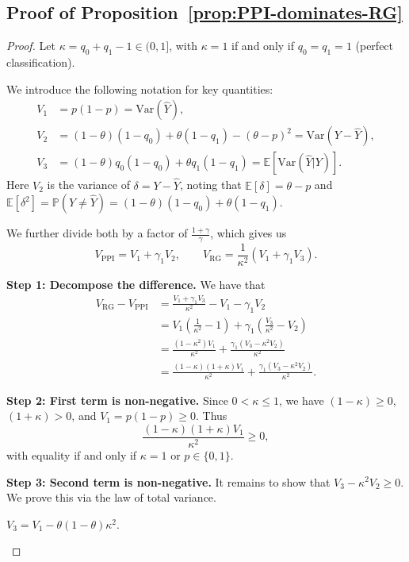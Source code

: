 \subsection{Proof of Proposition~\ref{prop:PPI-dominates-RG}}


\begin{proof}
Let $\kappa = q_0 + q_1 - 1 \in (0,1]$, with $\kappa = 1$ if and only if $q_0 = q_1 = 1$ (perfect classification).

We introduce the following notation for key quantities:
\begin{align*}
V_1 &= p(1-p) = \mathrm{Var}(\hat{Y}), \\
V_2 &= (1-\theta)(1-q_0) + \theta(1-q_1) - (\theta - p)^2 = \mathrm{Var}(Y - \hat{Y}), \\
V_3 &= (1-\theta)q_0(1-q_0) + \theta q_1(1-q_1) = \mathbb{E}[\mathrm{Var}(\hat{Y}|Y)].
\end{align*}
Here $V_2$ is the variance of $\delta = Y - \hat{Y}$, noting that $\mathbb{E}[\delta] = \theta - p$ and $\mathbb{E}[\delta^2] = \mathbb{P}(Y \neq \hat{Y}) = (1-\theta)(1-q_0) + \theta(1-q_1)$.

We further divide both by a factor of $\frac{1+\gamma}{\gamma}$, which gives us
\[
V_{\mathrm{PPI}} = V_1 + \gamma_1 V_2, \qquad
V_{\mathrm{RG}} = \frac{1}{\kappa^2}(V_1 + \gamma_1 V_3).
\]

\textbf{Step 1: Decompose the difference.} We have that
\begin{align*}
V_{\mathrm{RG}} - V_{\mathrm{PPI}} 
&= \frac{V_1 + \gamma_1 V_3}{\kappa^2} - V_1 - \gamma_1 V_2 \\
&= V_1 \left(\frac{1}{\kappa^2} - 1\right) + \gamma_1\left(\frac{V_3}{\kappa^2} - V_2\right) \\
&= \frac{(1-\kappa^2)V_1}{\kappa^2} + \frac{\gamma_1(V_3 - \kappa^2 V_2)}{\kappa^2} \\
&= \frac{(1-\kappa)(1+\kappa)V_1}{\kappa^2} + \frac{\gamma_1(V_3 - \kappa^2 V_2)}{\kappa^2}.
\end{align*}

\textbf{Step 2: First term is non-negative.} Since $0 < \kappa \le 1$, we have $(1-\kappa) \ge 0$, $(1+\kappa) > 0$, and $V_1 = p(1-p) \ge 0$. Thus 
\[
\frac{(1-\kappa)(1+\kappa)V_1}{\kappa^2} \ge 0,
\]
with equality if and only if $\kappa = 1$ or $p \in \{0,1\}$.

\textbf{Step 3: Second term is non-negative.} It remains to show that $V_3 - \kappa^2 V_2 \ge 0$. We prove this via the law of total variance.

\begin{lemma}
\label{lem:variance-identity}
$V_3 = V_1 - \theta(1-\theta)\kappa^2$.
\end{lemma}


\end{proof}
